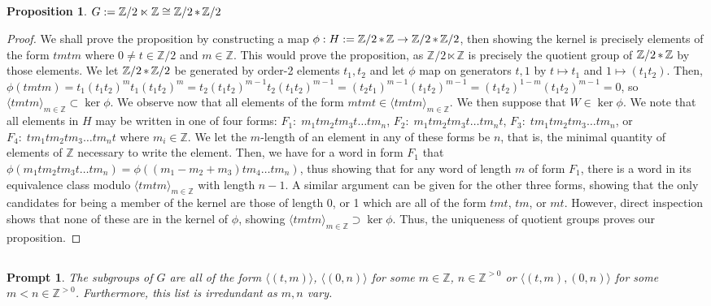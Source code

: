 \documentclass[english]{article}
\newcommand{\ZZ}{\mathbb{Z}}
\newcommand{\prt}[1]{\setcounter{subsection}{#1-1}\subsection{}}
\newtheorem*{proposition*}{Proposition}
\newtheorem*{prompt*}{Prompt}
\theoremstyle{remark}
\theoremstyle{definition}
\newcommand{\frp}{\mathop{\large {\mathlarger{*}}}}
\begin{document}
\prt{3}\begin{proposition*}
	$G:=\ZZ/2\ltimes \ZZ\cong \ZZ/2\frp \ZZ/2$
\end{proposition*}
\begin{proof}
	We shall prove the proposition by constructing a map $\phi:H:=\ZZ/2\frp \ZZ\to \ZZ/2\frp \ZZ/2$, then showing the kernel is precisely elements of the form $tmtm$ where $0\neq t\in \ZZ/2$ and $m\in \ZZ$. This would prove the proposition, as $\ZZ/2\ltimes \ZZ$ is precisely the quotient group of $\ZZ/2\frp\ZZ$ by those elements. We let $\ZZ/2\frp \ZZ/2$ be generated by order-2 elements $t_1,t_2$ and let $\phi$ map on generators $t,1$ by $t\mapsto t_1$ and $1\mapsto (t_1t_2)$. Then, $\phi(tmtm)=t_1(t_1t_2)^mt_1(t_1t_2)^m=t_2(t_1t_2)^{m-1}t_2(t_1t_2)^{m-1}=(t_2t_1)^{m-1}(t_1t_2)^{m-1}=(t_1t_2)^{1-m}(t_1t_2)^{m-1}=0$, so $\langle tmtm\rangle_{m\in \ZZ}\subset \ker \phi$. We observe now that all elements of the form $mtmt\in \langle tmtm\rangle_{m\in \ZZ}$. We then suppose that $W\in \ker \phi$. We note that all elements in $H$ may be written in one of four forms: $F_1:\;m_1tm_2tm_3t\hdots tm_n$,  $F_2:\;m_1tm_2tm_3t\hdots tm_nt$, $F_3:\;tm_1tm_2tm_3\hdots tm_n$, or $F_4:\;tm_1tm_2tm_3\hdots tm_nt$ where $m_i\in \ZZ$. We let the $m$-length of an element in any of these forms be $n$, that is, the minimal quantity of elements of $\ZZ$ necessary to write the element. Then, we have for a word in form $F_1$ that $\phi(m_1tm_2tm_3t\hdots tm_n)=\phi((m_1-m_2+m_3)tm_4\hdots tm_n)$, thus showing that for any word of length $m$ of form $F_1$, there is a word in its equivalence class modulo $\langle tmtm\rangle_{m\in \ZZ}$ with length $n-1$. A similar argument can be given for the other three forms, showing that the only candidates for being a  member of the kernel are those of length 0, or 1 which are all of the form $tmt$, $tm$, or $mt$. However, direct inspection shows that none of these are in the kernel of $\phi$, showing $\langle tmtm\rangle_{m\in \ZZ}\supset \ker \phi$. Thus, the uniqueness of quotient groups proves our proposition.
\end{proof}
\prt{4}
\begin{prompt*}
	The subgroups of $G$ are all of the form $\langle (t,m)\rangle$, $\langle (0,n)\rangle$ for some $m\in \ZZ$, $n\in \ZZ^{>0}$ or $\langle (t,m),(0,n)\rangle$ for some  $m<n\in \ZZ^{>0}$. Furthermore, this list is irredundant as $m,n$ vary. 
\end{prompt*}
\end{document}
